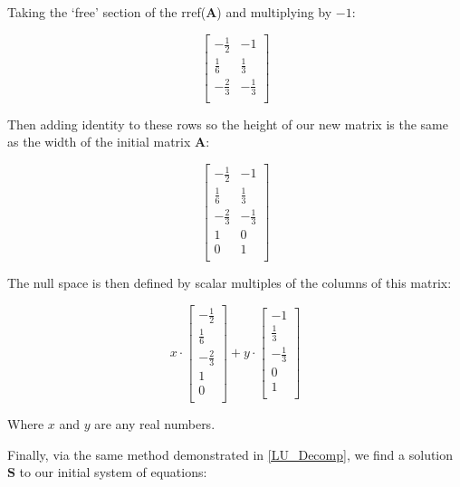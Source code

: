 \documentclass[a4paper, 12pt]{article}
\begin{document}
Taking the `free' section of the rref($\mathbf{A}$) and multiplying by $-1$:

\begin{equation*}
	\begin{bmatrix}
	-\frac{1}{2} & -1 \\
	\frac{1}{6} & \frac{1}{3} \\
	-\frac{2}{3} & -\frac{1}{3} \\
	\end{bmatrix}
\end{equation*}

Then adding identity to these rows so the height of our new matrix is the same as the width of the initial matrix $\mathbf{A}$:

\begin{equation*}
	\begin{bmatrix}
	-\frac{1}{2} & -1 \\
	\frac{1}{6} & \frac{1}{3} \\
	-\frac{2}{3} & -\frac{1}{3} \\
	1 & 0 \\
	0 & 1 \\
	\end{bmatrix}
\end{equation*}

The null space is then defined by scalar multiples of the columns of this matrix:

\begin{equation*}
	x \cdot
	\begin{bmatrix}
		-\frac{1}{2} \\
		\frac{1}{6} \\
		-\frac{2}{3} \\
		1 \\
		0 \\
	\end{bmatrix}
	+ y \cdot
	\begin{bmatrix}
		-1 \\
		\frac{1}{3} \\
		-\frac{1}{3} \\
		0 \\
		1 \\
	\end{bmatrix}
\end{equation*}

\begin{center}
	Where $x$ and $y$ are any real numbers.
\end{center}

Finally, via the same method demonstrated in \ref{LU_Decomp}, we find a solution $\mathbf{S}$ to our initial system of equations:
\end{document}
